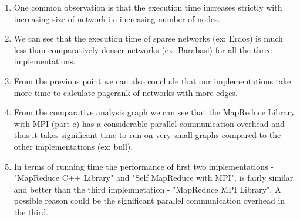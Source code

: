 \documentclass{article}
\begin{document}
    \begin{enumerate}
        \item One common observation is that the execution time increases strictly with increasing size of network i.e increasing number of nodes.
        \item We can see that the execution time of sparse networks (ex: Erdos) is much less than comparatively denser networks (ex: Barabasi) for all the three implementations.
        \item From the previous point we can also conclude that our implementations take more time to calculate pagerank of networks with more edges.
        \item From the comparative analysis graph we can see that the MapReduce Library with MPI (part c) has a considerable parallel communication overhead and thus it takes significant time to run on very small graphs compared to the other implementations (ex: bull).
        \item In terms of running time the performance of first two implementations - "MapReduce C++ Library" and "Self MapReduce with MPI", is fairly similar and better than the third implemnetation - "MapReduce MPI Library". A possible reason could be the significant parallel communication overhead in the third.
   \end{enumerate}
    
\end{document}
